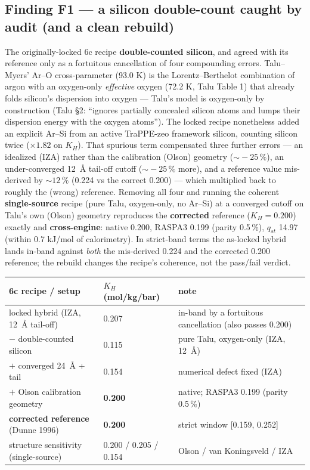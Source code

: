 \subsection{Finding F1 --- a silicon double-count caught by audit (and a
clean rebuild)}\label{finding-f1-the-arsi-term-is-load-bearing-1.82-on-k_h}

The originally-locked 6c recipe \textbf{double-counted silicon}, and
agreed with its reference only as a fortuitous cancellation of four
compounding errors. Talu--Myers' Ar--O cross-parameter (93.0 K) is the
Lorentz--Berthelot combination of argon with an oxygen-only
\emph{effective} oxygen (72.2 K, Talu Table 1) that already folds
silicon's dispersion into oxygen --- Talu's model is oxygen-only by
construction (Talu \S2: ``ignores partially concealed silicon atoms and
lumps their dispersion energy with the oxygen atoms''). The locked recipe
nonetheless added an explicit Ar--Si from an active TraPPE-zeo framework
silicon, counting silicon twice (\(\times 1.82\) on \(K_H\)). That
spurious term compensated three further errors --- an idealized (IZA)
rather than the calibration (Olson) geometry (\(\sim\!-25\,\%\)), an
under-converged 12~\AA{} tail-off cutoff (\(\sim\!-25\,\%\) more), and a
reference value mis-derived by \(\sim\!12\,\%\) (0.224 vs the correct
0.200) --- which multiplied back to roughly the (wrong) reference.
Removing all four and running the coherent \textbf{single-source} recipe
(pure Talu, oxygen-only, no Ar--Si) at a converged cutoff on Talu's own
(Olson) geometry reproduces the \textbf{corrected} reference
(\(K_H = 0.200\)) exactly and \textbf{cross-engine}: native 0.200,
RASPA3 0.199 (parity 0.5\,\%), \(q_{st}\) 14.97 (within 0.7 kJ/mol of
calorimetry). In strict-band terms the as-locked hybrid lands in-band against \emph{both} the
mis-derived 0.224 and the corrected 0.200 reference; the rebuild changes the recipe's coherence, not the
pass/fail verdict.

{%
\begin{longtable}[]{@{}lll@{}}
\toprule\noalign{}
6c recipe / setup & \(K_H\) (mol/kg/bar) & note \\
\midrule\noalign{}
\endhead
\bottomrule\noalign{}
\endlastfoot
locked hybrid (IZA, 12~\AA{} tail-off) & 0.207 & in-band by a fortuitous cancellation (also passes 0.200) \\
\(-\) double-counted silicon & 0.115 & pure Talu, oxygen-only (IZA, 12~\AA{}) \\
\(+\) converged 24~\AA{} + tail & 0.154 & numerical defect fixed (IZA) \\
\(+\) Olson calibration geometry & \textbf{0.200} & native; RASPA3 0.199 (parity 0.5\,\%) \\
\textbf{corrected reference} (Dunne 1996) & \textbf{0.200} & strict window [0.159, 0.252] \\
structure sensitivity (single-source) & 0.200 / 0.205 / 0.154 & Olson / van Koningsveld / IZA \\
\end{longtable}
}

